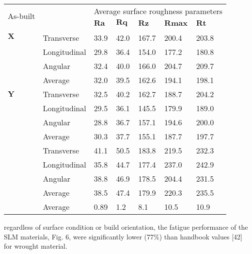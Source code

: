 \documentclass[10pt]{article}
\begin{document}
\begin{center}
\begin{tabular}{lllllll}
\hline
\multirow{2}{*}{As-built} &  & \multicolumn{6}{l}{Average surface roughness parameters} \\
\cline { 3 - 7 }
 &  & $\mathbf{R a}$ & $\mathbf{R q}$ & $\mathbf{R z}$ & $\mathbf{R m a x}$ & $\mathbf{R t}$ &  \\
\hline
\multirow{2}{*}{$\boldsymbol{X}$} &  &  &  &  &  &  &  \\
 & Transverse & 33.9 & 42.0 & 167.7 & 200.4 & 203.8 &  \\
 & Longitudinal & 29.8 & 36.4 & 154.0 & 177.2 & 180.8 &  \\
 & Angular & 32.4 & 40.0 & 166.0 & 204.7 & 209.7 &  \\
 & Average & 32.0 & 39.5 & 162.6 & 194.1 & 198.1 &  \\
$\boldsymbol{Y}$ & Transverse & 32.5 & 40.2 & 162.7 & 188.7 & 204.2 &  \\
 & Longitudinal & 29.5 & 36.1 & 145.5 & 179.9 & 189.0 &  \\
 & Angular & 28.8 & 36.7 & 157.1 & 194.6 & 200.0 &  \\
 & Average & 30.3 & 37.7 & 155.1 & 187.7 & 197.7 &  \\
 & Transverse & 41.1 & 50.5 & 183.8 & 219.5 & 232.3 &  \\
 & Longitudinal & 35.8 & 44.7 & 177.4 & 237.0 & 242.9 &  \\
 & Angular & 38.8 & 46.9 & 178.5 & 204.4 & 231.5 &  \\
 & Average & 38.5 & 47.4 & 179.9 & 220.3 & 235.5 &  \\
 & Average & 0.89 & 1.2 & 8.1 & 10.5 & 10.9 &  \\
\hline
\end{tabular}
\end{center}

regardless of surface condition or build orientation, the fatigue performance of the SLM materials, Fig. 6, were significantly lower (77\%) than handbook values [42] for wrought material.
\end{document}
